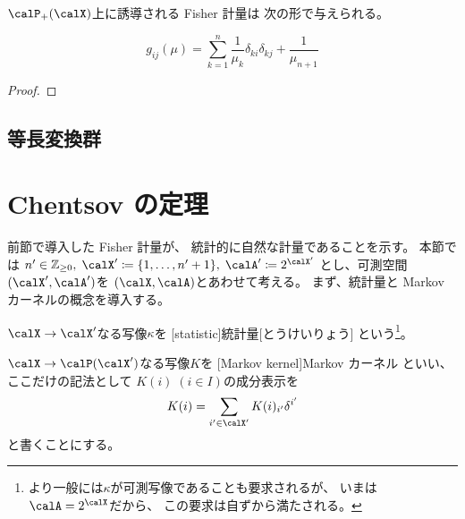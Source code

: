 \documentclass[report]{jlreq}
\begin{document}
$\calP_+(\calX)$上に誘導される Fisher 計量は
次の形で与えられる。

\begin{proposition}
    \begin{equation}
        g_{ij}(\mu)
            = \sum_{k = 1}^n \frac{1}{\mu_k} \delta_{ki} \delta_{kj}
            + \frac{1}{\mu_{n + 1}}
    \end{equation}
    \TODO{}
\end{proposition}

\begin{proof}
    \TODO{}
\end{proof}

\subsection{等長変換群}

\TODO{}


%
\section{Chentsov の定理}

前節で導入した Fisher 計量が、
統計的に自然な計量であることを示す。
本節では
$n' \in \Z_{\ge 0}, \;
    \calX' \coloneqq \{ 1, \dots, n' + 1 \}, \;
    \calA' \coloneqq 2^{\calX'}$
とし、可測空間$(\calX', \calA')$を
$(\calX, \calA)$とあわせて考える。
まず、統計量と Markov カーネルの概念を導入する。

\begin{definition}[統計量]
    $\calX \to \calX'$なる写像$\kappa$を
    [statistic]{統計量}[とうけいりょう]
    という\footnote{
        より一般には$\kappa$が可測写像であることも要求されるが、
        いまは$\calA = 2^\calX$だから、
        この要求は自ずから満たされる。
    }。
\end{definition}

\begin{definition}
    $\calX \to \calP(\calX')$なる写像$K$を
    [Markov kernel]{Markov カーネル}
    といい、ここだけの記法として
    $K(i) \; (i \in I)$の成分表示を
    \begin{equation}
        K(i) = \sum_{i' \in \calX'} K(i)_{i'} \delta^{i'}
    \end{equation}
    と書くことにする。
\end{definition}
\end{document}
